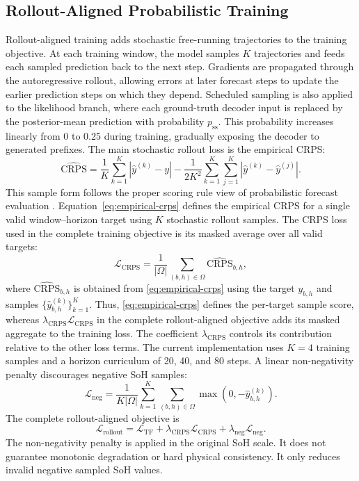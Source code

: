 \documentclass[conference]{IEEEtran}
\begin{document}
\subsection{Rollout-Aligned Probabilistic Training}

Rollout-aligned training adds stochastic free-running trajectories to the
training objective. At each training window, the model samples $K$ trajectories
and feeds each sampled prediction back to the next step. Gradients are
propagated through the autoregressive rollout, allowing errors at later
forecast steps to update the earlier prediction steps on which they depend.
Scheduled sampling is also applied to the likelihood branch, where each
ground-truth decoder input is replaced by the posterior-mean prediction with
probability $p_{\mathrm{ss}}$. This probability increases linearly from 0 to
0.25 during training, gradually exposing the decoder to generated prefixes.
The main stochastic rollout loss is the empirical CRPS:
\begin{equation}
\widehat{\mathrm{CRPS}}
=
\frac{1}{K}\sum_{k=1}^{K} |\hat{y}^{(k)}-y|
-
\frac{1}{2K^2}\sum_{k=1}^{K}\sum_{j=1}^{K}
|\hat{y}^{(k)}-\hat{y}^{(j)}|.
\label{eq:empirical-crps}
\end{equation}
This sample form follows the proper scoring rule view of probabilistic
forecast evaluation \cite{gneiting2007scoring}.
Equation~\eqref{eq:empirical-crps} defines the empirical CRPS for a single
valid window--horizon target using $K$ stochastic rollout samples. The CRPS
loss used in the complete training objective is its masked average over all
valid targets:
\[
\mathcal{L}_{\mathrm{CRPS}}
=
\frac{1}{|\Omega|}
\sum_{(b,h)\in\Omega}
\widehat{\mathrm{CRPS}}_{b,h},
\]
where $\widehat{\mathrm{CRPS}}_{b,h}$ is obtained from
\eqref{eq:empirical-crps} using the target $y_{b,h}$ and samples
$\{\hat{y}_{b,h}^{(k)}\}_{k=1}^{K}$. Thus,
\eqref{eq:empirical-crps} defines the per-target sample score, whereas
$\lambda_{\mathrm{CRPS}}\mathcal{L}_{\mathrm{CRPS}}$ in the complete
rollout-aligned objective adds its masked aggregate to the training loss.
The coefficient $\lambda_{\mathrm{CRPS}}$ controls its contribution relative
to the other loss terms. The current implementation uses $K=4$ training
samples and a horizon curriculum of 20, 40, and 80 steps. A
linear non-negativity penalty discourages negative SoH samples:
\begin{equation}
\mathcal{L}_{\mathrm{neg}}
=
\frac{1}{K|\Omega|}
\sum_{k=1}^{K}\sum_{(b,h)\in\Omega}
\max(0,-\hat{y}_{b,h}^{(k)}).
\end{equation}
The complete rollout-aligned objective is
\begin{equation}
\mathcal{L}_{\mathrm{rollout}}
=
\mathcal{L}_{\mathrm{TF}}
+ \lambda_{\mathrm{CRPS}}\mathcal{L}_{\mathrm{CRPS}}
+ \lambda_{\mathrm{neg}}\mathcal{L}_{\mathrm{neg}}.
\end{equation}
The non-negativity penalty is applied in the original SoH scale. It does not
guarantee monotonic degradation or hard physical consistency. It only reduces
invalid negative sampled SoH values.
\end{document}
